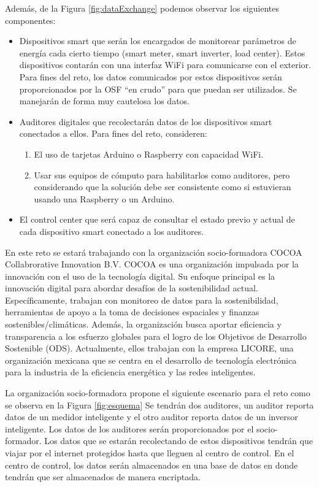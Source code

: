 \documentclass{article}
\begin{document}
             Además, de la Figura \ref{fig:dataExchange} podemos observar los siguientes componentes:

             \begin{itemize}
                 \item Dispositivos smart que serán los encargados de monitorear parámetros de energía cada cierto tiempo (smart meter, smart inverter, load center). Estos dispositivos contarán con una interfaz WiFi para comunicarse con el exterior. Para fines del reto, los datos comunicados por estos dispositivos serán proporcionados por la OSF “en crudo” para que puedan ser utilizados. Se manejarán de forma muy cautelosa los datos.
                 \item Auditores digitales que recolectarán datos de los dispositivos smart conectados a ellos. Para fines del reto, consideren:
                 \begin{enumerate}
                     \item El uso de tarjetas Arduino o Raspberry con capacidad WiFi.
                     \item Usar sus equipos de cómputo para habilitarlos como auditores, pero considerando que la solución debe ser consistente como si estuvieran usando una Raspberry o un Arduino.
                 \end{enumerate}
                 \item El control center que será capaz de consultar el estado previo y actual de cada dispositivo smart  conectado a los auditores.
             \end{itemize}

            En este reto se estará trabajando con la organización socio-formadora COCOA Collabrorative Innovation B.V. COCOA es una organización impulsada por la innovación con el uso de la tecnología digital. Su enfoque principal es la innovación digital para abordar desafíos de la sostenibilidad actual. Específicamente, trabajan con monitoreo de datos para la sostenibilidad, herramientas de apoyo a la toma de decisiones espaciales y finanzas sostenibles/climáticas. Además, la organización busca aportar eficiencia y transparencia a los esfuerzo globales para el logro de los Objetivos de Desarrollo Sostenible (ODS). \cite{cocoa} Actualmente, ellos trabajan con la empresa LICORE, una organización mexicana que se centra en el desarrollo de tecnología electrónica para la industria de la eficiencia energética y las redes inteligentes.

            La organización socio-formadora propone el siguiente escenario para el reto como se observa en la Figura \ref{fig:esquema} Se tendrán dos auditores, un auditor reporta datos de un medidor inteligente y el otro auditor reporta datos de un inversor inteligente. Los datos de los auditores serán proporcionados por el socio-formador. Los datos que se estarán recolectando de estos dispositivos tendrán que viajar por el internet protegidos hasta que lleguen al centro de control. En el centro de control, los datos serán almacenados en una base de datos en donde tendrán que ser almacenados de manera encriptada.
\end{document}
